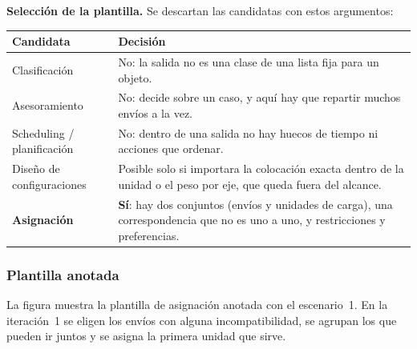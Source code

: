 \documentclass[12pt,a4paper,twoside,spanish]{article}      %
\begin{document}
\textbf{Selección de la plantilla.} Se descartan las candidatas con estos
argumentos:

{\small
\begin{center}
\begin{tabularx}{\textwidth}{|>{\raggedright\arraybackslash}p{3.4cm}|X|} \hline
\textbf{Candidata} & \textbf{Decisión} \\ \hline\hline
Clasificación & No: la salida no es una clase de una lista fija para un objeto. \\ \hline
Asesoramiento & No: decide sobre un caso, y aquí hay que repartir muchos envíos a la vez. \\ \hline
Scheduling / planificación & No: dentro de una salida no hay huecos de tiempo ni acciones que ordenar. \\ \hline
Diseño de configuraciones & Posible solo si importara la colocación exacta dentro de la unidad o el peso por eje, que queda fuera del alcance. \\ \hline
\textbf{Asignación} & \textbf{Sí}: hay dos conjuntos (envíos y unidades de carga), una correspondencia que no es uno a uno, y restricciones y preferencias. \\ \hline
\end{tabularx}
\end{center}
}

\subsubsection{Plantilla anotada}


La figura muestra la plantilla de asignación anotada con el escenario~1. En
la iteración~1 se eligen los envíos con alguna incompatibilidad, se agrupan
los que pueden ir juntos y se asigna la primera unidad que sirve.
\end{document}
